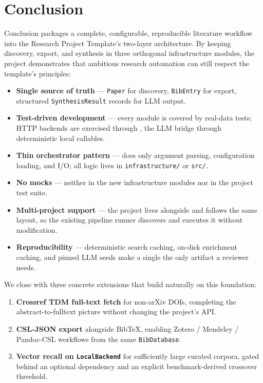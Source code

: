 \documentclass[
  ignorenonframetext,
]{beamer}
\author{\texorpdfstring{}{}}
\date{}
\providecommand{\tightlist}{%
  \setlength{\itemsep}{0pt}\setlength{\parskip}{0pt}}
\begin{document}
\section{Conclusion}\label{sec:conclusion}

\begin{frame}{Conclusion}
 packages a complete, configurable,
reproducible literature workflow into the Research Project Template's
two-layer architecture. By keeping discovery, export, and synthesis in
three orthogonal infrastructure modules, the project demonstrates that
ambitious research automation can still respect the template's
principles:

\begin{itemize}
\tightlist
\item
  \textbf{Single source of truth} --- \texttt{Paper} for discovery,
  \texttt{BibEntry} for export, structured \texttt{SynthesisResult}
  records for LLM output.
\item
  \textbf{Test-driven development} --- every module is covered by
  real-data tests; HTTP backends are exercised through
  , the LLM bridge through deterministic local
  callables.
\item
  \textbf{Thin orchestrator pattern} ---
   does only argument parsing,
  configuration loading, and I/O; all logic lives in
  \texttt{infrastructure/} or \texttt{src/}.
\item
  \textbf{No mocks} --- neither in the new infrastructure modules nor in
  the project test suite.
\item
  \textbf{Multi-project support} --- the project lives alongside
   and follows the same layout, so the
  existing pipeline runner discovers and executes it without
  modification.
\item
  \textbf{Reproducibility} --- deterministic search caching, on-disk
  enrichment caching, and pinned LLM seeds make a single
   the only artifact a reviewer needs.
\end{itemize}

We close with three concrete extensions that build naturally on this
foundation:

\begin{enumerate}
\tightlist
\item
  \textbf{Crossref TDM full-text fetch} for non-arXiv DOIs, completing
  the abstract-to-fulltext picture without changing the project's API.
\item
  \textbf{CSL-JSON export} alongside BibTeX, enabling Zotero / Mendeley
  / Pandoc-CSL workflows from the same \texttt{BibDatabase}.
\item
  \textbf{Vector recall on \texttt{LocalBackend}} for sufficiently large
  curated corpora, gated behind an optional dependency and an explicit
  benchmark-derived crossover threshold.
\end{enumerate}


\end{frame}
\end{document}
